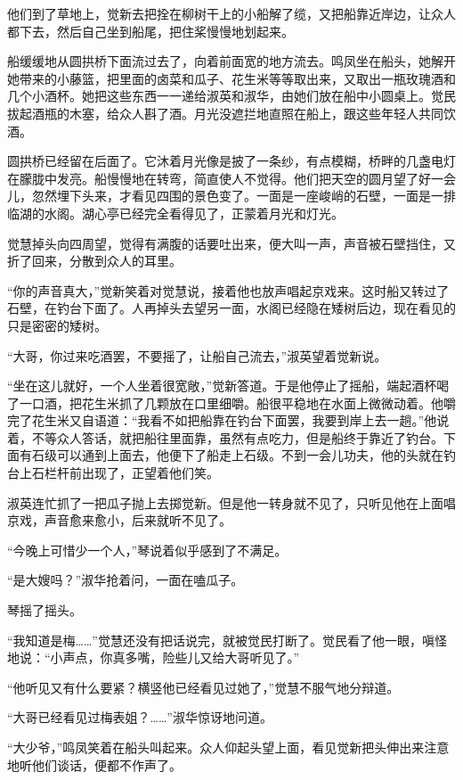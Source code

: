 \par 他们到了草地上，觉新去把拴在柳树干上的小船解了缆，又把船靠近岸边，让众人都下去，然后自己坐到船尾，把住桨慢慢地划起来。
\par 船缓缓地从圆拱桥下面流过去了，向着前面宽的地方流去。鸣凤坐在船头，她解开她带来的小藤篮，把里面的卤菜和瓜子、花生米等等取出来，又取出一瓶玫瑰酒和几个小酒杯。她把这些东西一一递给淑英和淑华，由她们放在船中小圆桌上。觉民拔起酒瓶的木塞，给众人斟了酒。月光没遮拦地直照在船上，跟这些年轻人共同饮酒。
\par 圆拱桥已经留在后面了。它沐着月光像是披了一条纱，有点模糊，桥畔的几盏电灯在朦胧中发亮。船慢慢地在转弯，简直使人不觉得。他们把天空的圆月望了好一会儿，忽然埋下头来，才看见四围的景色变了。一面是一座峻峭的石壁，一面是一排临湖的水阁。湖心亭已经完全看得见了，正蒙着月光和灯光。
\par 觉慧掉头向四周望，觉得有满腹的话要吐出来，便大叫一声，声音被石壁挡住，又折了回来，分散到众人的耳里。
\par “你的声音真大，”觉新笑着对觉慧说，接着他也放声唱起京戏来。这时船又转过了石壁，在钓台下面了。人再掉头去望另一面，水阁已经隐在矮树后边，现在看见的只是密密的矮树。
\par “大哥，你过来吃酒罢，不要摇了，让船自己流去，”淑英望着觉新说。
\par “坐在这儿就好，一个人坐着很宽敞，”觉新答道。于是他停止了摇船，端起酒杯喝了一口酒，把花生米抓了几颗放在口里细嚼。船很平稳地在水面上微微动着。他嚼完了花生米又自语道：“我看不如把船靠在钓台下面罢，我要到岸上去一趟。”他说着，不等众人答话，就把船往里面靠，虽然有点吃力，但是船终于靠近了钓台。下面有石级可以通到上面去，他便下了船走上石级。不到一会儿功夫，他的头就在钓台上石栏杆前出现了，正望着他们笑。
\par 淑英连忙抓了一把瓜子抛上去掷觉新。但是他一转身就不见了，只听见他在上面唱京戏，声音愈来愈小，后来就听不见了。
\par “今晚上可惜少一个人，”琴说着似乎感到了不满足。
\par “是大嫂吗？”淑华抢着问，一面在嗑瓜子。
\par 琴摇了摇头。
\par “我知道是梅……”觉慧还没有把话说完，就被觉民打断了。觉民看了他一眼，嗔怪地说：“小声点，你真多嘴，险些儿又给大哥听见了。”
\par “他听见又有什么要紧？横竖他已经看见过她了，”觉慧不服气地分辩道。
\par “大哥已经看见过梅表姐？……”淑华惊讶地问道。
\par “大少爷，”鸣凤笑着在船头叫起来。众人仰起头望上面，看见觉新把头伸出来注意地听他们谈话，便都不作声了。
